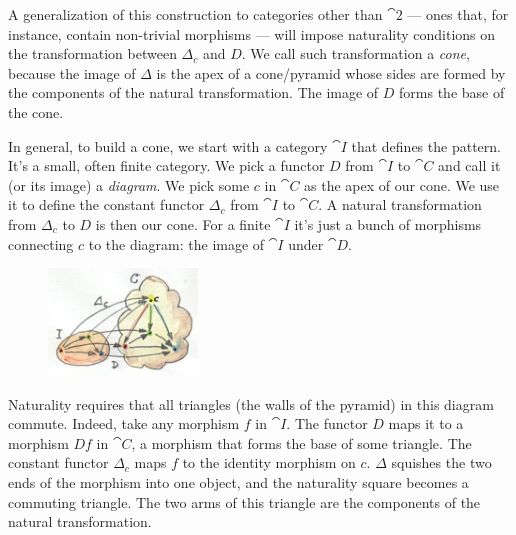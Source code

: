 \noindent
A generalization of this construction to categories other than
$\cat{2}$ --- ones that, for instance, contain non-trivial morphisms
--- will impose naturality conditions on the transformation between
$\Delta_c$ and $D$. We call such transformation a \emph{cone},
because the image of $\Delta$ is the apex of a cone/pyramid whose sides are
formed by the components of the natural transformation. The image of $D$
forms the base of the cone.

In general, to build a cone, we start with a category $\cat{I}$ that
defines the pattern. It's a small, often finite category. We pick a
functor $D$ from $\cat{I}$ to $\cat{C}$ and call it (or its image) a
\emph{diagram}. We pick some $c$ in $\cat{C}$ as the apex of our
cone. We use it to define the constant functor $\Delta_c$ from
$\cat{I}$ to $\cat{C}$. A natural transformation from $\Delta_c$
to $D$ is then our cone. For a finite $\cat{I}$ it's just a bunch of
morphisms connecting $c$ to the diagram: the image of $\cat{I}$
under $\cat{D}$.

\begin{figure}[H]
\centering
\includegraphics[width=1.56250in]{images/cone.jpg}
\end{figure}

\noindent
Naturality requires that all triangles (the walls of the pyramid) in
this diagram commute. Indeed, take any morphism $f$ in $\cat{I}$.
The functor $D$ maps it to a morphism $D f$ in $\cat{C}$, a
morphism that forms the base of some triangle. The constant functor
$\Delta_c$ maps $f$ to the identity morphism on
$c$. $\Delta$ squishes the two ends of the morphism into one object, and
the naturality square becomes a commuting triangle. The two arms of this
triangle are the components of the natural transformation.

\begin{figure}[H]
\centering
{}
\end{figure}

